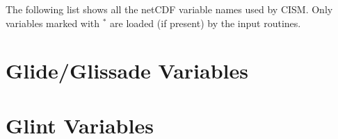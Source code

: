 \label{ug.sec.varlist}
The following list shows all the netCDF variable names used by CISM. 
Only variables marked with $^\ast$ are loaded (if present) by the input routines.
\section{Glide/Glissade Variables}

%
\section{Glint Variables}

